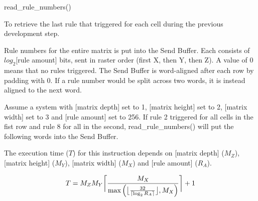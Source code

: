 

\format
read\_rule\_numbers()

\purpose

To retrieve the last rule that triggered for each cell during the previous development step.

\description

Rule numbers for the entire matrix is put into the Send Buffer.
Each consists of $log_2$[rule amount] bits, sent in raster order (first X, then Y, then Z).
A value of 0 means that no rules triggered.
The Send Buffer is word-aligned after each row by padding with 0.
If a rule number would be split across two words, it is instead aligned to the next word.

\example

Assume a system with [matrix depth] set to 1, [matrix height] set to 2, [matrix width] set to 3 and [rule amount] set to 256.
If rule 2 triggered for all cells in the fist row and rule 8 for all in the second,
read\_rule\_numbers() will put the following words into the Send Buffer.


\notes

The execution time ($T$) for this instruction depends on [matrix depth] ($M_Z$), [matrix height] ($M_Y$), [matrix width] ($M_X$) and [rule amount] ($R_A$).

$$ T = M_Z M_Y \ceil[\bigg]{ \frac{M_X}{\max \left( \floor[\big]{ \frac{32}{\ceil{\log_2{R_A}}} }, M_X \right)} } + 1 $$
